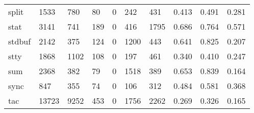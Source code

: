 \begin{longtable}{lp{2.0cm}p{2.0cm}p{2.0cm}p{2.0cm}p{2.0cm}p{2.0cm}p{2.0cm}p{2.0cm}p{2.0cm}}
split     &                   1533 &                                780 &                                80 &                                0 &                               242 &                             431 &                                   0.413 &                                  0.491 &                                0.281 \\
stat      &                   3141 &                                741 &                               189 &                                0 &                               416 &                            1795 &                                   0.686 &                                  0.764 &                                0.571 \\
stdbuf    &                   2142 &                                375 &                               124 &                                0 &                              1200 &                             443 &                                   0.641 &                                  0.825 &                                0.207 \\
stty      &                   1868 &                               1102 &                               108 &                                0 &                               197 &                             461 &                                   0.340 &                                  0.410 &                                0.247 \\
sum       &                   2368 &                                382 &                                79 &                                0 &                              1518 &                             389 &                                   0.653 &                                  0.839 &                                0.164 \\
sync      &                    847 &                                355 &                                74 &                                0 &                               106 &                             312 &                                   0.484 &                                  0.581 &                                0.368 \\
tac       &                  13723 &                               9252 &                               453 &                                0 &                              1756 &                            2262 &                                   0.269 &                                  0.326 &                                0.165 \\

\end{longtable}
